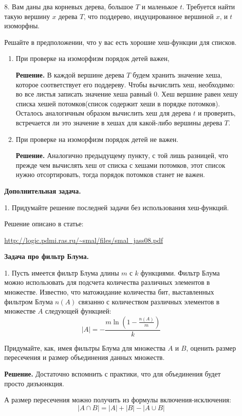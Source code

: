 \begin{enumerate}
	\item[8.] Вам даны два корневых дерева, большое $T$ и маленькое $t$. Требуется найти такую вершину $x$
	дерева $T$, что поддерево, индуцированное вершиной $x$, и $t$ изоморфны.
	
	Решайте в предположении, что у вас есть хорошие хеш-функции для списков.
	
	\begin{enumerate}
		\item При проверке на изоморфизм порядок детей важен,
		
		\textbf{Решение.} В каждой вершине дерева $T$ будем хранить значение хеша, которое соответствует его 
		поддереву. Чтобы вычислить хеш, необходимо: во все листья записать значение хеша равный $0$. Хеш вершине 
		равен хешу списка хешей потомков(список содержит хеши в порядке потомков). Осталось аналогичным образом 
		вычислить хеш для дерева $t$ и проверить, встречается ли это значение в хешах для какой-либо вершины 
		дерева $T$. 
		
		\item При проверке на изоморфизм порядок детей не важен.
		
		\textbf{Решение.} Аналогично предыдущему пункту, с той лишь разницей, что прежде чем вычислять хеш от 
		списка с хешами потомков, этот список нужно отсортировать, тогда порядок потомков станет не важен. 
	\end{enumerate}
	
	\textbf{Дополнительная задача.}
	
	\item[1.] Придумайте решение последней задачи без использования хеш-функций.
	
	Решение описано в статье:
	
	\url{http://logic.pdmi.ras.ru/~smal/files/smal_jass08.pdf}
	
	\textbf{Задача про фильтр Блума.}
	
	\item[1.] Пусть имеется фильтр Блума длины $m$ с $k$ функциями. Фильтр Блума можно использовать для подсчета 
	количества различных элементов в множестве. Известно, что матожидание количества бит, выставленных фильтром 
	Блума $n(A)$ связанно с количеством различных элементов в множестве $A$ следующей функцией:
	\begin{equation}
		|A| = - \dfrac{m \ln (1-\frac{n(A)}{m})}{k}
	\end{equation}
	
	Придумайте, как, имея фильтры Блума для множества $A$ и $B$, оценить размер пересечения и размер объединения 
	данных множеств.
	
	\textbf{Решение.} Достаточно вспомнить с практики, что для объединения будет просто дизъюнкция. 
	
	А размер пересечения можно получить из формулы включения-исключения:
	\begin{equation*}
	|A \cap B| = |A| + |B| - |A \cup B|
	\end{equation*}
\end{enumerate}
